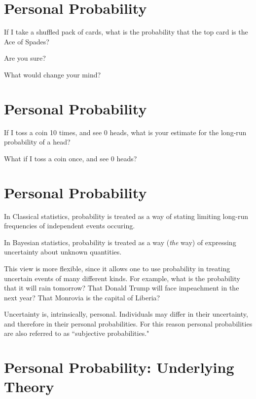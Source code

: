 
\section*{\hfil Personal Probability}

If I take a shuffled pack of cards, what is the probability
that the top card is the Ace of Spades? 

Are you sure?

What would change your mind?

\es\bs

\section*{\hfil Personal Probability}

If I toss a coin 10 times, and see 0 heads, what is your estimate
for the long-run probability of a head?

What if I toss a coin once, and see 0 heads?

\es\bs

\section*{\hfil Personal Probability}

In Classical statistics, probability is treated as a way of stating
limiting long-run frequencies of independent events occuring.

In Bayesian statistics, probability is treated as a way ({\it the} way)
of expressing uncertainty about unknown quantities.

This view is more flexible, since it allows one to use
probability in treating uncertain events of many different kinds.
For example, what is the probability 
that it will rain tomorrow? That Donald Trump will face impeachment
in the next year?
That Monrovia is the capital of Liberia?

Uncertainty is, intrinsically, personal. Individuals may differ in their uncertainty, and therefore
in their personal probabilities.   For this reason personal probabilities are also
referred to as ``subjective probabilities." 

\es\bs

\section*{Personal Probability: Underlying Theory}

